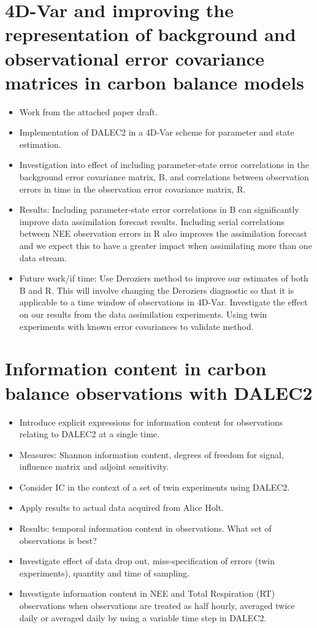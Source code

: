 \documentclass[11pt]{article}
\begin{document}
\section{4D-Var and improving the representation of background and observational error covariance matrices in carbon balance models}
\begin{itemize}
\item Work from the attached paper draft.
\item Implementation of DALEC2 in a 4D-Var scheme for parameter and state estimation.
\item Investigation into effect of including parameter-state error correlations in the background error covariance matrix, B, and correlations between observation errors in time in the observation error covariance matrix, R.
\item Results: Including parameter-state error correlations in B can significantly improve data assimilation forecast results. Including serial correlations between NEE observation errors in R also improves the assimilation forecast and we expect this to have a greater impact when assimilating more than one data stream.
\item Future work/if time: Use Deroziers method to improve our estimates of both B and R. This will involve changing the Deroziers diagnostic so that it is applicable to a time window of observations in 4D-Var. Investigate the effect on our results from the data assimilation experiments. Using twin experiments with known error covariances to validate method.
\end{itemize}


\section{Information content in carbon balance observations with DALEC2}
\begin{itemize}
\item Introduce explicit expressions for information content for observations relating to DALEC2 at a single time.
\item Measures: Shannon information content, degrees of freedom for signal, influence matrix and adjoint sensitivity.
\item Consider IC in the context of a set of twin experiments using DALEC2.
\item Apply results to actual data acquired from Alice Holt.
\item Results: temporal information content in observations. What set of observations is best?
\item Investigate effect of data drop out, miss-specification of errors (twin experiments), quantity and time of sampling.
\item Investigate information content in NEE and Total Respiration (RT) observations when observations are treated as half hourly, averaged twice daily or averaged daily by using a variable time step in DALEC2.   
\end{itemize}
\end{document}
